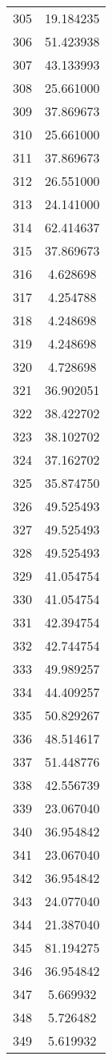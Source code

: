 \documentclass[12pt]{article}
\begin{document}
\begin{longtable}{@{}cc@{}}
305 & 19.184235 \\
306 & 51.423938 \\
307 & 43.133993 \\
308 & 25.661000 \\
309 & 37.869673 \\
310 & 25.661000 \\
311 & 37.869673 \\
312 & 26.551000 \\
313 & 24.141000 \\
314 & 62.414637 \\
315 & 37.869673 \\
316 & 4.628698 \\
317 & 4.254788 \\
318 & 4.248698 \\
319 & 4.248698 \\
320 & 4.728698 \\
321 & 36.902051 \\
322 & 38.422702 \\
323 & 38.102702 \\
324 & 37.162702 \\
325 & 35.874750 \\
326 & 49.525493 \\
327 & 49.525493 \\
328 & 49.525493 \\
329 & 41.054754 \\
330 & 41.054754 \\
331 & 42.394754 \\
332 & 42.744754 \\
333 & 49.989257 \\
334 & 44.409257 \\
335 & 50.829267 \\
336 & 48.514617 \\
337 & 51.448776 \\
338 & 42.556739 \\
339 & 23.067040 \\
340 & 36.954842 \\
341 & 23.067040 \\
342 & 36.954842 \\
343 & 24.077040 \\
344 & 21.387040 \\
345 & 81.194275 \\
346 & 36.954842 \\
347 & 5.669932 \\
348 & 5.726482 \\
349 & 5.619932 \\

\end{longtable}
\end{document}
